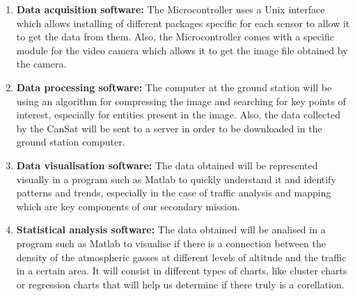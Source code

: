 \documentclass[11pt]{article}
\begin{document}
\begin{enumerate}
\item \textbf{Data acquisition software:} The Microcontroller uses a Unix interface which allows installing of different packages specific for each sensor to allow it to get the data from them. Also, the Microcontroller comes with a specific module for the video camera which allows it to get the image file obtained by the camera.
\item \textbf{Data  processing software:} The computer at the ground station will be using an algorithm for compressing the image and searching for key points of interest, especially for entities present in the image. Also, the data collected by the CanSat will be sent to a server in order to be downloaded in the ground station computer.
\item \textbf{Data visualisation software:} The data obtained will be represented visually in a program such as Matlab to quickly understand it and identify patterns and trends, especially in the case of traffic analysis and mapping which are key components of our secondary mission.
\item \textbf{Statistical analysis software:} The data obtained will be analised in a program such as Matlab to visualise if there is a connection between the density of the atmospheric gasses at different levels of altitude and the traffic in a certain area. It will consist in different types of charts, like cluster charts or regression charts that will help us determine if there truly is a corellation.
\end{enumerate}
\end{document}
